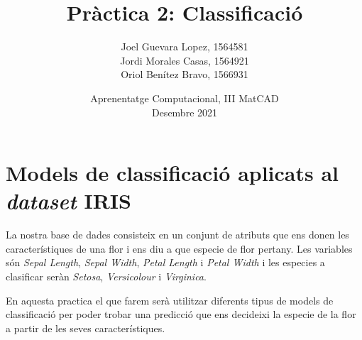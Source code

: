 \documentclass[a4paper, 11pt]{article}
\title{\Huge{\textbf{Pràctica 2: Classificació}}}
\author{\Large{Joel Guevara Lopez, 1564581}
        \\\Large{Jordi Morales Casas, 1564921}
        \\\Large{Oriol Benítez Bravo, 1566931}}
\date{Aprenentatge Computacional, III MatCAD\\ \vspace{6pt} Desembre 2021}
\begin{document}
    \maketitle
    
    \section{Models de classificació aplicats al \textit{dataset} IRIS}
    
    La nostra base de dades consisteix en un conjunt de atributs que ens donen 
    les característiques de una flor i ens diu a que especie de flor pertany.
    Les variables són \textit{Sepal Length}, \textit{Sepal Width},  \textit{Petal
    Length} i \textit{Petal Width} i les especies a clasificar seràn \textit{Setosa}, 
    \textit{Versicolour} i \textit{Virginica}.
    
    En aquesta practica el que farem serà utilitzar diferents tipus de models de 
    classificació per poder trobar una predicció que ens decideixi la especie
    de la flor a partir de les seves característiques.
\end{document}
